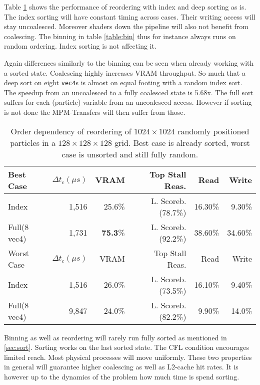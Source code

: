 \documentclass[m,times]{cgMA}
\begin{document}
Table \ref{table:sort} shows the performance of reordering with index and deep sorting as is. The index sorting will have constant timing across cases. Their writing access will stay uncoalesced. Moreover shaders down the pipeline will also not benefit from coalescing. The binning in table \ref{table:bin} thus for instance always runs on random ordering. Index sorting is not affecting it.

Again differences similarly to the binning can be seen when already working with a sorted state. Coalescing highly increases VRAM throughput. So much that a deep sort on eight \texttt{vec4}s is almost on equal footing with a random index sort. The speedup from an uncoalesced to a fully coalesced state is 5.68x. The full sort suffers for each (particle) variable from an uncoalesced access. However if sorting is not done the MPM-Transfers will then suffer from those.

\begin{table}[htpb]
  \begin{tabular}{ | l | r | r | r | r | r| }    \hline
    Best Case    &  $\Delta t_c (\mu s)$&VRAM  & Top Stall Reas.    & Read   & Write  \\\hline
    Index        &  1,516       &25.6\%& L. Scoreb.(78.7\%) & 16.30\%& 9.30\% \\\hline
    Full(8 vec4) &  1,731       &\textbf{75.3}\%& L. Scoreb.(92.2\%) & 38.60\%& 34.60\%\\
    \hline
    \hline
    Worst Case             &  $\Delta t_c(\mu s)$         &VRAM              & Top Stall Reas.    & Read   & Write\\\hline
    Index                  &  1,516                &26.0\%            & L. Scoreb.(73.5\%) & 16.10\%& 9.40\%\\\hline
    Full(8 vec4)           &  9,847                &24.0\%            & L. Scoreb.(82.2\%) & 9.90\% & 14.0\%\\
    \hline
 \end{tabular}
\caption{Order dependency of reordering of $1024\times1024$ randomly positioned particles in a $128\times128\times128$ grid. Best case is already sorted, worst case is unsorted and still fully random.}\label{table:sort}
\end{table}

Binning as well as reordering will rarely run fully sorted as mentioned in \ref{sec:sort}. Sorting works on the last sorted state. The CFL condition encourages limited reach. Most physical processes will move uniformly. These two properties in general will guarantee higher coalescing as well as L2-cache hit rates. It is however up to the dynamics of the problem how much time is spend sorting.
\\
\end{document}
